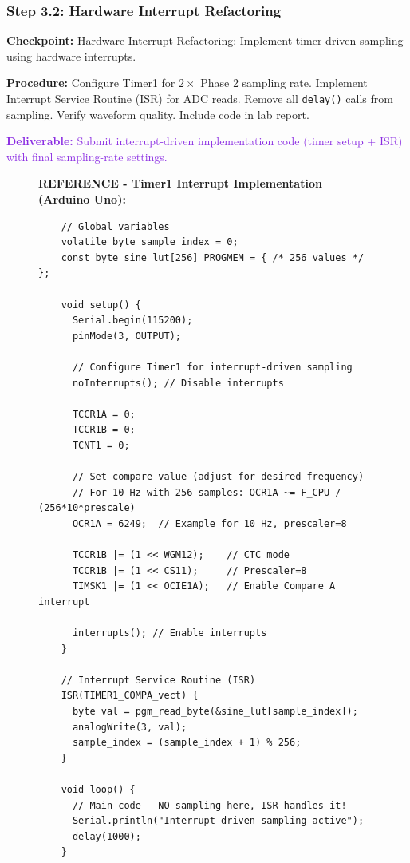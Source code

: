 \documentclass[11pt,letterpaper]{article}
\providecommand{\cpECE}[1]{\textcolor{OliveGreen}{\textbf{Checkpoint:} #1}}
\providecommand{\delECE}[1]{\textcolor{BlueViolet}{\textbf{Deliverable:} #1}}
\begin{document}
\subsubsection{Step 3.2: Hardware Interrupt Refactoring}
\cpECE{Hardware Interrupt Refactoring:} Implement timer-driven sampling using hardware interrupts.

\textbf{Procedure:}
Configure Timer1 for $2\times$ Phase 2 sampling rate. Implement Interrupt Service Routine (ISR) for ADC reads. Remove all \texttt{delay()} calls from sampling. Verify waveform quality. Include code in lab report.

\delECE{Submit interrupt-driven implementation code (timer setup + ISR) with final sampling-rate settings.}

\begin{figure}[H]
    \centering
    \vspace{0.5in}
    \textbf{REFERENCE - Timer1 Interrupt Implementation (Arduino Uno):}
    
    \begin{verbatim}
    // Global variables
    volatile byte sample_index = 0;
    const byte sine_lut[256] PROGMEM = { /* 256 values */ };
    
    void setup() {
      Serial.begin(115200);
      pinMode(3, OUTPUT);
      
      // Configure Timer1 for interrupt-driven sampling
      noInterrupts(); // Disable interrupts
      
      TCCR1A = 0;
      TCCR1B = 0;
      TCNT1 = 0;
      
      // Set compare value (adjust for desired frequency)
      // For 10 Hz with 256 samples: OCR1A ~= F_CPU / (256*10*prescale)
      OCR1A = 6249;  // Example for 10 Hz, prescaler=8
      
      TCCR1B |= (1 << WGM12);    // CTC mode
      TCCR1B |= (1 << CS11);     // Prescaler=8
      TIMSK1 |= (1 << OCIE1A);   // Enable Compare A interrupt
      
      interrupts(); // Enable interrupts
    }
    
    // Interrupt Service Routine (ISR)
    ISR(TIMER1_COMPA_vect) {
      byte val = pgm_read_byte(&sine_lut[sample_index]);
      analogWrite(3, val);
      sample_index = (sample_index + 1) % 256;
    }
    
    void loop() {
      // Main code - NO sampling here, ISR handles it!
      Serial.println("Interrupt-driven sampling active");
      delay(1000);
    }
    \end{verbatim}
    

\end{figure}
\end{document}
